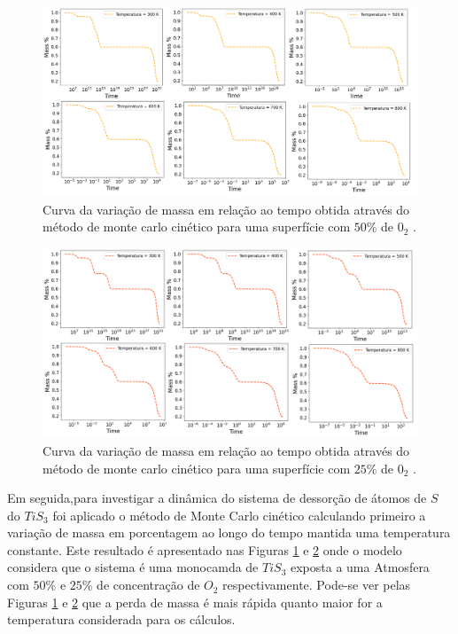 \documentclass[11pt]{article}
\begin{document}
\begin{figure}[!htbp]
\centering\includegraphics[scale=0.8]{figures/var-massa-tempo-2.png}
\caption{Curva da variação de massa em relação ao tempo obtida através do método de monte carlo cinético para uma superfície com $50\%$ de $0_2$ . }
\label{f2}
\end{figure}

\begin{figure}[!htbp]
\centering\includegraphics[scale=0.8]{figures/var-massa-tempo-25.png}
\caption{Curva da variação de massa em relação ao tempo obtida através do método de monte carlo cinético para uma superfície com $25\%$ de $0_2$ . }

\label{f3}
\end{figure}

Em seguida,para investigar a dinâmica do sistema de dessorção de átomos de \(S\) do \(TiS_3\) foi aplicado o método de Monte Carlo cinético calculando primeiro a variação de massa em porcentagem ao longo do tempo mantida uma temperatura constante. Este resultado é apresentado nas Figuras \ref{f2} e \ref{f3} onde o modelo considera que o sistema é uma monocamda de \(TiS_3\) exposta a uma Atmosfera com \(50\%\) e \(25\%\) de concentração de \(O_2\) respectivamente. Pode-se ver pelas Figuras \ref{f2} e \ref{f3} que a perda de massa é mais rápida quanto maior for a temperatura considerada para os cálculos.
\end{document}
